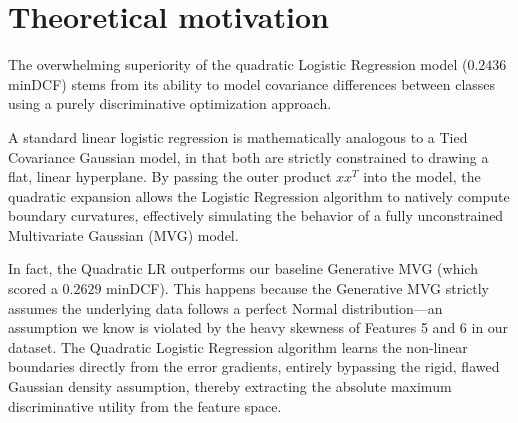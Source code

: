 \section{Theoretical motivation}

The overwhelming superiority of the quadratic Logistic Regression model ($0.2436$ minDCF) stems from its ability to model covariance differences between classes using a purely discriminative optimization approach. 

A standard linear logistic regression is mathematically analogous to a Tied Covariance Gaussian model, in that both are strictly constrained to drawing a flat, linear hyperplane. By passing the outer product $xx^T$ into the model, the quadratic expansion allows the Logistic Regression algorithm to natively compute boundary curvatures, effectively simulating the behavior of a fully unconstrained Multivariate Gaussian (MVG) model. 

In fact, the Quadratic LR outperforms our baseline Generative MVG (which scored a $0.2629$ minDCF). This happens because the Generative MVG strictly assumes the underlying data follows a perfect Normal distribution—an assumption we know is violated by the heavy skewness of Features 5 and 6 in our dataset. The Quadratic Logistic Regression algorithm learns the non-linear boundaries directly from the error gradients, entirely bypassing the rigid, flawed Gaussian density assumption, thereby extracting the absolute maximum discriminative utility from the feature space.
